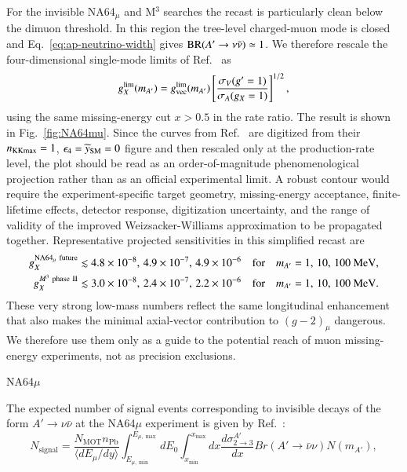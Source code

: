 \documentclass[onecolumn, aps, nofootinbib, prd, preprint, floats, floatfix, amsmath, amssymb, superscriptaddress, preprintnumbers]{revtex4-1}
\begin{document}
For the invisible NA64$_\mu$ and M$^3$ searches the recast is particularly clean below the dimuon threshold. In this region the tree-level charged-muon mode is closed and Eq.~\eqref{eq:ap-neutrino-width} gives \({\rm BR}(A'\to\nu\bar\nu)\simeq1\). We therefore rescale the four-dimensional single-mode limits of Ref.~\cite{Chakraborty:2025jbd} as
\begin{equation}
g_X^{\rm lim}(m_{A'})
=g_{\rm vec}^{\rm lim}(m_{A'})
\left[
\frac{\sigma_V(g'=1)}{\sigma_A(g_X=1)}
\right]^{1/2},
\label{eq:beamdump-rescale}
\end{equation}
using the same missing-energy cut \(x>0.5\) in the rate ratio. The result is shown in Fig.~\ref{fig:NA64mu}. Since the curves from Ref.~\cite{Chakraborty:2025jbd} are digitized from their \(n_{\rm KKmax}=1\), \(\epsilon_4=\widetilde y_{\rm SM}=0\) figure and then rescaled only at the production-rate level, the plot should be read as an order-of-magnitude phenomenological projection rather than as an official experimental limit. A robust contour would require the experiment-specific target geometry, missing-energy acceptance, finite-lifetime effects, detector response, digitization uncertainty, and the range of validity of the improved Weizsacker-Williams approximation to be propagated together. Representative projected sensitivities in this simplified recast are
\begin{align}
g_X^{\rm NA64_\mu~future}
&\lesssim 4.8\times10^{-8},\,4.9\times10^{-7},\,4.9\times10^{-6}
\quad{\rm for}\quad
m_{A'}=1,\,10,\,100~{\rm MeV},\nonumber\\
g_X^{M^3~{\rm phase~II}}
&\lesssim 3.0\times10^{-8},\,2.4\times10^{-7},\,2.2\times10^{-6}
\quad{\rm for}\quad
m_{A'}=1,\,10,\,100~{\rm MeV}.
\label{eq:beamdump-numbers}
\end{align}
These very strong low-mass numbers reflect the same longitudinal enhancement that also makes the minimal axial-vector contribution to \((g-2)_\mu\) dangerous. We therefore use them only as a guide to the potential reach of muon missing-energy experiments, not as precision exclusions.

NA64$\mu$

The expected number of signal events corresponding to invisible decays of the form $A' \to \nu\bar{\nu}$ at the NA64$\mu$  experiment is given by Ref.~\cite{111}:
\begin{equation}
N_{\text{signal}} = \frac{N_{\text{MOT}} n_{\text{Pb}}}{\langle dE_\mu/dy \rangle} \int_{E_{\mu,\min}}^{E_{\mu,\max}} dE_0 \int_{x_{\min}}^{x_{\max}} dx \frac{d\sigma_{2\to3}^{A'}}{dx} Br(A' \to \bar{\nu}\nu) N(m_{A'}),
\label{eq:NA64Signal}
\end{equation}
\end{document}
